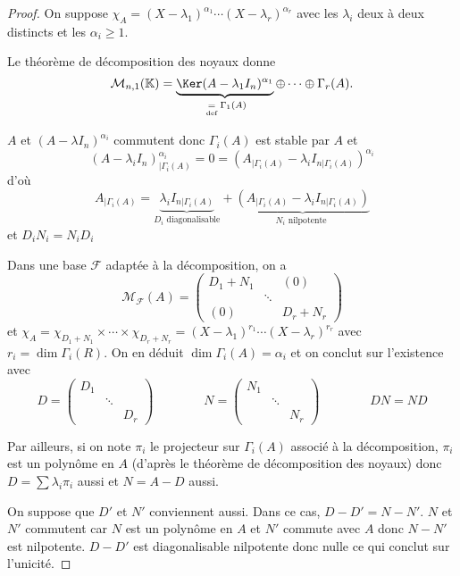 \begin{proof}
    On suppose $\chi_A=(X-\lambda_1)^{\alpha_1}\cdots (X-\lambda_r)^{\alpha_r}$ avec les $\lambda_i$ deux à deux distincts et les $\alpha_i\geq 1$.

    Le théorème de décomposition des noyaux donne \[
        \mathcal M_{n, 1}(\K)=\underbrace{\Ker(A-\lambda_1I_n)^{\alpha_1}}_{\defeq \Gamma_1(A)}\oplus\cdots \oplus \Gamma_r(A).
    \]

    $A$ et $(A-\lambda I_n)^{\alpha_i}$ commutent donc $\Gamma_i(A)$ est stable par $A$ et \[
        (A-\lambda_i I_n)^{\alpha_i}_{|\Gamma_i(A)}=0=(A_{|\Gamma_i(A)}-\lambda_i I_{n|\Gamma_i(A)})^{\alpha_i}
    \]
    d'où \[
        A_{|\Gamma_i(A)}=\underbrace{\lambda_i I_{n|\Gamma_i(A)}}_{D_i \text{ diagonalisable}}+ \underbrace{\left(A_{|\Gamma_i(A)}-\lambda_i I_{n|\Gamma_i(A)}  \right)}_{N_i\text{ nilpotente }}
    \]
    et $D_iN_i=N_iD_i$

    Dans une base $\mathcal F$ adaptée à la décomposition, on a \[
        \mathcal M_{\mathcal F}(A)= \begin{pmatrix}
            D_1+N_1 & & (0)\\
                    &\ddots &\\
            (0)&&D_r+N_r
        \end{pmatrix}
    \]
    et $\chi_A=\chi_{D_1+N_1}\times \cdots \times \chi_{D_r+N_r}=(X-\lambda_1)^{r_1}\cdots (X-\lambda_r)^{r_r}$ avec $r_i=\dim\Gamma_i(R)$. On en déduit $\dim\Gamma_i(A)=\alpha_i$ et on conclut sur l'existence avec \[
        D= \begin{pmatrix}
            D_1 & & \\
                &\ddots &\\
                &&D_r
        \end{pmatrix}
        \qquad \qquad N= \begin{pmatrix}
            N_1&&\\
               &\ddots&\\
               &&N_r
        \end{pmatrix}
        \qquad \qquad DN=ND
    \]

    Par ailleurs, si on note $\pi_i$ le projecteur sur $\Gamma_i(A)$ associé à la décomposition, $\pi_i$ est un polynôme en $A$ (d'après le théorème de décomposition des noyaux) donc $D=\sum \lambda_i\pi_i$ aussi et $N=A-D$ aussi.

    On suppose que $D'$ et $N'$ conviennent aussi. Dans ce cas, $D-D'=N-N'$. $N$ et $N'$ commutent car $N$ est un polynôme en $A$ et $N'$ commute avec $A$ donc $N-N'$ est nilpotente. $D-D'$ est diagonalisable nilpotente donc nulle ce qui conclut sur l'unicité.
\end{proof}

